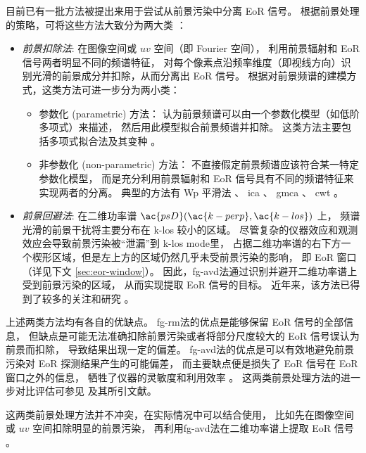 目前已有一批方法被提出来用于尝试从前景污染中分离 EoR 信号。
根据前景处理的策略，可将这些方法大致分为两大类 \cite{chapman2015,chapman2016}：
\begin{itemize}
\item \emph{前景扣除法}:
在图像空间或 $uv$ 空间（即 Fourier 空间），
利用前景辐射和 EoR 信号两者明显不同的频谱特征，
对每个像素点沿频率维度（即视线方向）识别光滑的前景成分并扣除，从而分离出 EoR 信号。
根据对前景频谱的建模方式，这类方法可进一步分为两小类：
\begin{itemize}
  \item 参数化 (parametric) 方法：
    认为前景频谱可以由一个参数化模型（如低阶多项式）来描述，
    然后用此模型拟合前景频谱并扣除。
    这类方法主要包括多项式拟合法及其变种
    \cite{wang2006,jelic2008,liu2009fgrm,wang2013,bonaldi2015}。
  \item 非参数化 (non-parametric) 方法：
    不直接假定前景频谱应该符合某一特定参数化模型，
    而是充分利用前景辐射和 EoR 信号具有不同的频谱特征来实现两者的分离。
    典型的方法有 Wp 平滑法 \cite{harker2009}、
    \ac{ica} \cite{chapman2012}、
    \ac{gmca} \cite{chapman2013}、
    \ac{cwt} \cite{gu2013}。
\end{itemize}

\item \emph{前景回避法}:
在二维功率谱 $\ac{psD}(\ac{k-perp}, \ac{k-los})$ 上，
频谱光滑的前景干扰将主要分布在 \ac{k-los} 较小的区域。
尽管复杂的仪器效应和观测效应会导致前景污染被\enquote{泄漏}到 \ac{k-los} \ac{mode}里，
占据二维功率谱的右下方一个楔形区域，但是左上方的区域仍然几乎未受前景污染的影响，
即 EoR 窗口（详见下文 \autoref{sec:eor-window}）。
因此，\ac{fg-avd}法通过识别并避开二维功率谱上受到前景污染的区域，
从而实现提取 EoR 信号的目标。
近年来，该方法已得到了较多的关注和研究 \cite{thyagarajan2013,liu2014,liu2014ii,
  barry2016,beardsley2016,trott2016,patil2017}。

\end{itemize}

上述两类方法均有各自的优缺点。
\ac{fg-rm}法的优点是能够保留 EoR 信号的全部信息，
但缺点是可能无法准确扣除前景污染或者将部分尺度较大的 EoR 信号误认为前景而扣除，
导致结果出现一定的偏差。
\ac{fg-avd}法的优点是可以有效地避免前景污染对 EoR 探测结果产生的可能偏差，
而主要缺点便是损失了 EoR 信号在 EoR 窗口之外的信息，
牺牲了仪器的灵敏度和利用效率 \cite{pober2014}。
这两类前景处理方法的进一步对比评估可参见  及其所引文献。

这两类前景处理方法并不冲突，在实际情况中可以结合使用，
比如先在图像空间或 $uv$ 空间扣除明显的前景污染，
再利用\ac{fg-avd}法在二维功率谱上提取 EoR 信号 \cite{datta2010}。


